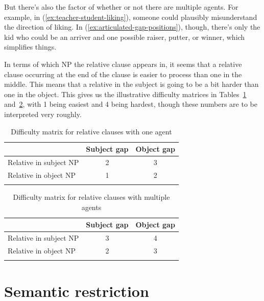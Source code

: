 But there's also the factor of whether or not there are multiple agents. For example, in (\ref{ex:teacher-student-liking}), someone could plausibly misunderstand the direction of liking. In (\ref{ex:articulated-gap-positions}), though, there's only the kid who could be an arriver and one possible raiser, putter, or winner, which simplifies things.

In terms of which NP the relative clause appears in, it seems that a relative clause occurring at the end of the clause is easier to process than one in the middle. This means that a relative in the subject is going to be a bit harder than one in the object. This gives us the illustrative difficulty matrices in Tables~\ref{tab:difficulty-matrix} and~\ref{tab:difficulty-matrix2}, with 1 being easiest and 4 being hardest, though these numbers are to be interpreted very roughly.

\begin{table}
\begin{tabular}{lcc}
\lsptoprule
 & Subject gap & Object gap \\
\midrule
Relative in subject NP & 2   & 3 \\
Relative in object NP   & 1   & 2     \\
\lspbottomrule
\end{tabular}
\caption{Difficulty matrix for relative clauses with one agent}
\label{tab:difficulty-matrix}
\end{table}

\begin{table}
\begin{tabular}{lcc}
\lsptoprule
 & Subject gap & Object gap \\
\midrule
Relative in subject NP & 3   & 4 \\
Relative in object NP   & 2   & 3     \\
\lspbottomrule
\end{tabular}
\caption{Difficulty matrix for relative clauses with multiple agents}
\label{tab:difficulty-matrix2}
\end{table}

\section{Semantic restriction}

